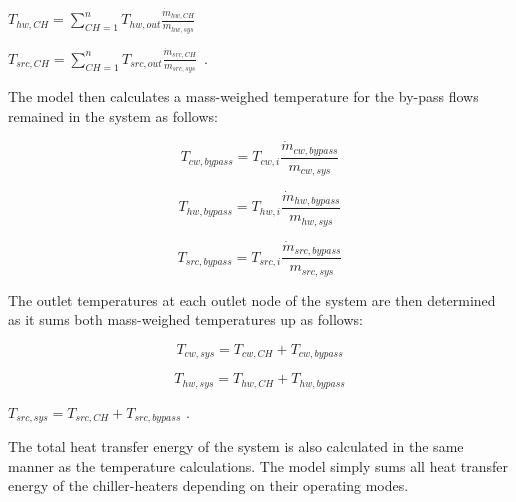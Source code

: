 \textbf{\emph{\({T_{hw,CH}} = \sum\limits_{CH = 1}^n {{T_{hw,out}}} \frac{{{{\dot m}_{hw,CH}}}}{{{m_{hw,sys}}}}\)}}

\textbf{\emph{\({T_{src,CH}} = \sum\limits_{CH = 1}^n {{T_{src,out}}} \frac{{{{\dot m}_{src,CH}}}}{{{m_{src,sys}}}}\)}}~.

The model then calculates a mass-weighed temperature for the by-pass flows remained in the system as follows:

\begin{equation}
{T_{cw,bypass}} = {T_{cw,i}}\frac{{{{\dot m}_{cw,bypass}}}}{{{m_{cw,sys}}}}
\end{equation}

\begin{equation}
{T_{hw,bypass}} = {T_{hw,i}}\frac{{{{\dot m}_{hw,bypass}}}}{{{m_{hw,sys}}}}
\end{equation}

\begin{equation}
{T_{src,bypass}} = {T_{src,i}}\frac{{{{\dot m}_{src,bypass}}}}{{{m_{src,sys}}}}
\end{equation}

The outlet temperatures at each outlet node of the system are then determined as it sums both mass-weighed temperatures up as follows:

\begin{equation}
{T_{cw,sys}} = {T_{cw,CH}} + {T_{cw,bypass}}
\end{equation}

\begin{equation}
{T_{hw,sys}} = {T_{hw,CH}} + {T_{hw,bypass}}
\end{equation}

\({T_{src,sys}} = {T_{src,CH}} + {T_{src,bypass}}\) .

The total heat transfer energy of the system is also calculated in the same manner as the temperature calculations. The model simply sums all heat transfer energy of the chiller-heaters depending on their operating modes.
